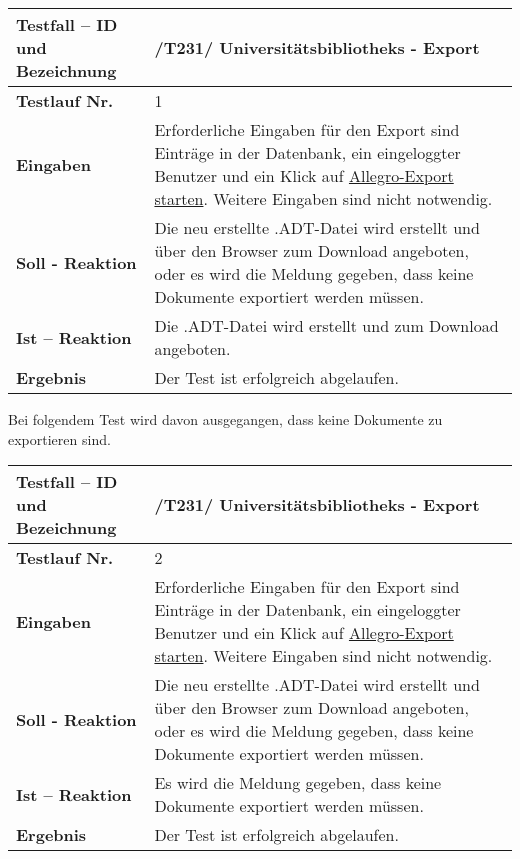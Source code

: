 \begin{longtable}{|p{5cm}|p{10cm}|}
\hline
\textbf{Testfall -- ID und Bezeichnung} &
\textnormal{/T231/ Universitätsbibliotheks - Export} \\
\hline 
\textbf{Testlauf Nr.} & \textnormal{1} \\
\hline
\textbf{Eingaben} & \textnormal{Erforderliche Eingaben für den Export sind Einträge in der
Datenbank, ein eingeloggter Benutzer und ein Klick auf \uline{Allegro-Export
starten}. Weitere Eingaben sind nicht notwendig. } \\
\hline
\textbf{Soll - Reaktion} & \textnormal{Die neu erstellte .ADT-Datei wird erstellt
und über den Browser zum Download angeboten, oder es wird die Meldung gegeben,
dass keine Dokumente exportiert werden müssen. } \\
\hline
\textbf{Ist -- Reaktion} & \textnormal{Die .ADT-Datei wird erstellt und zum
Download angeboten. } \\
\hline
\textbf{Ergebnis} & \textnormal{Der Test ist erfolgreich abgelaufen. } \\
\hline
\end{longtable}

Bei folgendem Test wird davon ausgegangen, dass keine Dokumente zu exportieren
sind.

\begin{longtable}{|p{5cm}|p{10cm}|}
\hline
\textbf{Testfall -- ID und Bezeichnung} &
\textnormal{/T231/ Universitätsbibliotheks - Export} \\
\hline 
\textbf{Testlauf Nr.} & \textnormal{2} \\
\hline
\textbf{Eingaben} & \textnormal{Erforderliche Eingaben für den Export sind Einträge in der
Datenbank, ein eingeloggter Benutzer und ein Klick auf \uline{Allegro-Export
starten}. Weitere Eingaben sind nicht notwendig. } \\
\hline
\textbf{Soll - Reaktion} & \textnormal{Die neu erstellte .ADT-Datei wird erstellt
und über den Browser zum Download angeboten, oder es wird die Meldung gegeben,
dass keine Dokumente exportiert werden müssen. } \\
\hline
\textbf{Ist -- Reaktion} & \textnormal{Es wird die Meldung gegeben, dass keine
Dokumente exportiert werden müssen. } \\
\hline
\textbf{Ergebnis} & \textnormal{Der Test ist erfolgreich abgelaufen. } \\
\hline
\end{longtable}
